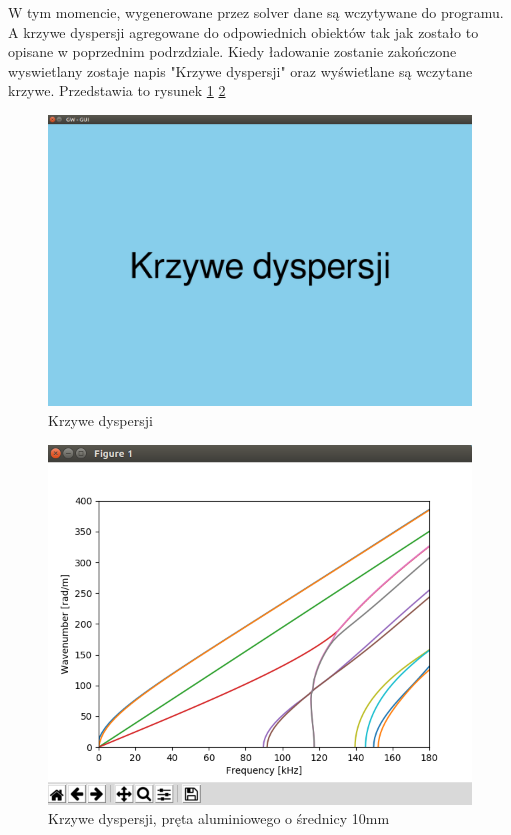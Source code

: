W tym momencie, wygenerowane przez solver dane są wczytywane do programu. A krzywe dyspersji agregowane do odpowiednich obiektów tak jak zostało to opisane w poprzednim podrzdziale. Kiedy ładowanie zostanie zakończone wyswietlany zostaje napis "Krzywe dyspersji" oraz wyświetlane są wczytane krzywe. Przedstawia to rysunek \ref{fig:gui3} \ref{fig:gui4} 

\begin{figure}[h]
\centering
\includegraphics[width=13cm]{Zdjecia/5/kasia/gui3}
\caption{Krzywe dyspersji}
\label{fig:gui3}
\end{figure}

\begin{figure}[h]
\centering
\includegraphics[width=13cm]{Zdjecia/5/kasia/gui4}
\caption{Krzywe dyspersji, pręta aluminiowego o średnicy 10mm}
\label{fig:gui4}
\end{figure}

